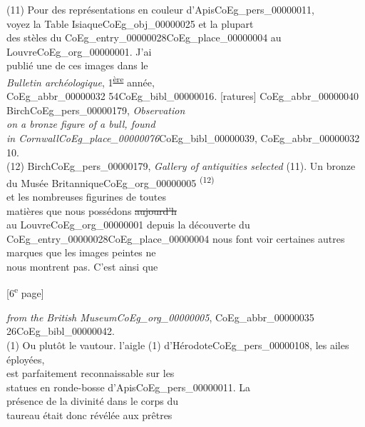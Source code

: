 \documentclass{book}
\begin{document}
{\begin{paracol}{2}
\noindent (11) Pour des représentations en couleur d’Apis\gls{CoEg_pers_00000011},\\
voyez la Table Isiaque\gls{CoEg_obj_00000025} et la plupart\\
des stèles du \Gls{CoEg_entry_00000028}\gls{CoEg_place_00000004} au Louvre\gls{CoEg_org_00000001}. J’ai\\
publié une de ces images dans le\\
\textit{Bulletin archéologique}, 1\textsuperscript{\underline{ère}} année,\\
\gls{CoEg_abbr_00000032} 54\gls{CoEg_bibl_00000016}. [ratures] \Gls{CoEg_abbr_00000040} Birch\gls{CoEg_pers_00000179}, \textit{Observation\\
on a bronze figure of a bull, found\\
in Cornwall\gls{CoEg_place_00000076}}\gls{CoEg_bibl_00000039}, \gls{CoEg_abbr_00000032} 10.\\
(12) Birch\gls{CoEg_pers_00000179}, \textit{Gallery of antiquities selected}
\switchcolumn
\noindent (11). Un bronze du Musée Britannique\gls{CoEg_org_00000005} \textsuperscript{(12)}\\
et les nombreuses figurines de toutes\\
matières que nous possédons \sout{aujourd’h}\\
au Louvre\gls{CoEg_org_00000001} depuis la découverte du\\
\Gls{CoEg_entry_00000028}\gls{CoEg_place_00000004} nous font voir certaines autres\\
marques que les images peintes ne\\
nous montrent pas. C’est ainsi que
\end{paracol}
{\footnotesize\begin{center} {[6\textsuperscript{e} page]}\end{center}}
\begin{paracol}{2}
\noindent \textit{from the British Museum\gls{CoEg_org_00000005}}, \gls{CoEg_abbr_00000035} 26\gls{CoEg_bibl_00000042}.\\
(1) Ou plutôt le vautour.
\switchcolumn
\noindent l’aigle (1) d’Hérodote\gls{CoEg_pers_00000108}, les ailes éployées,\\
est parfaitement reconnaissable sur les\\
statues en ronde-bosse d’Apis\gls{CoEg_pers_00000011}. La\\
présence de la divinité dans le corps du\\
taureau était donc révélée aux prêtres\\

\end{paracol}}
\end{document}
